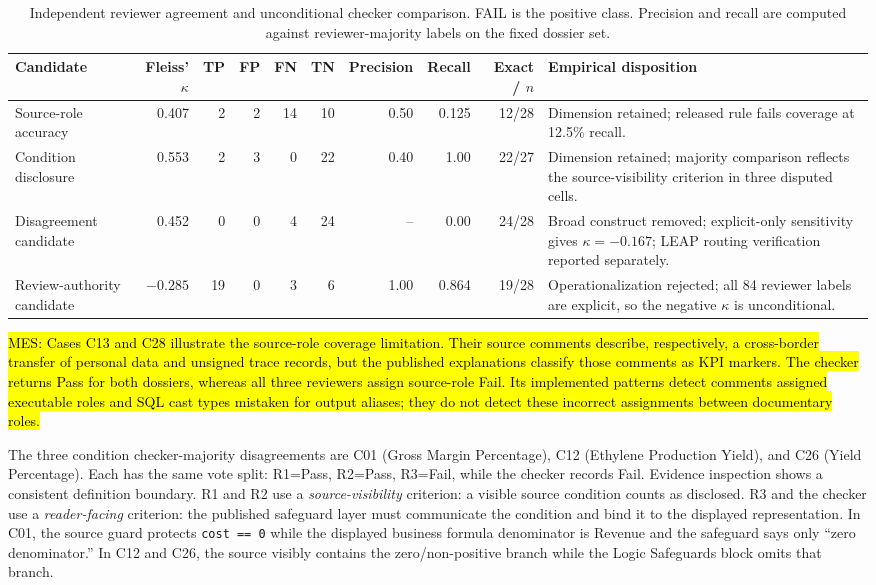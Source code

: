 \documentclass[a4paper,fleqn]{cas-dc}
\newcommand{\mes}[1]{{\sethlcolor{orange}\hl{MES: #1}}}
\begin{document}
\begin{table}[t]
\centering
\caption{Independent reviewer agreement and unconditional checker comparison. FAIL is the positive class. Precision and recall are computed against reviewer-majority labels on the fixed dossier set.}
\label{tab:independent}
\begin{tabularx}{\textwidth}{@{}lrrrrrrrrY@{}}
\toprule
Candidate & Fleiss' $\kappa$ & TP & FP & FN & TN & Precision & Recall & Exact / $n$ & Empirical disposition \\
\midrule
Source-role accuracy & 0.407 & 2 & 2 & 14 & 10 & 0.50 & 0.125 & 12/28 & Dimension retained; released rule fails coverage at 12.5\% recall. \\
Condition disclosure & 0.553 & 2 & 3 & 0 & 22 & 0.40 & 1.00 & 22/27 & Dimension retained; majority comparison reflects the source-visibility criterion in three disputed cells. \\
Disagreement candidate & 0.452 & 0 & 0 & 4 & 24 & -- & 0.00 & 24/28 & Broad construct removed; explicit-only sensitivity gives $\kappa=-0.167$; LEAP routing verification reported separately. \\
Review-authority candidate & $-0.285$ & 19 & 0 & 3 & 6 & 1.00 & 0.864 & 19/28 & Operationalization rejected; all 84 reviewer labels are explicit, so the negative $\kappa$ is unconditional. \\
\bottomrule
\end{tabularx}
\end{table}

\mes{Cases C13 and C28 illustrate the source-role coverage limitation. Their source comments describe, respectively, a cross-border transfer of personal data and unsigned trace records, but the published explanations classify those comments as KPI markers. The checker returns Pass for both dossiers, whereas all three reviewers assign source-role Fail. Its implemented patterns detect comments assigned executable roles and SQL cast types mistaken for output aliases; they do not detect these incorrect assignments between documentary roles.}

The three condition checker-majority disagreements are C01 (Gross Margin Percentage), C12 (Ethylene Production Yield), and C26 (Yield Percentage). Each has the same vote split: R1=Pass, R2=Pass, R3=Fail, while the checker records Fail. Evidence inspection shows a consistent definition boundary. R1 and R2 use a \emph{source-visibility} criterion: a visible source condition counts as disclosed. R3 and the checker use a \emph{reader-facing} criterion: the published safeguard layer must communicate the condition and bind it to the displayed representation. In C01, the source guard protects \texttt{cost == 0} while the displayed business formula denominator is Revenue and the safeguard says only ``zero denominator.'' In C12 and C26, the source visibly contains the zero/non-positive branch while the Logic Safeguards block omits that branch.
\end{document}
